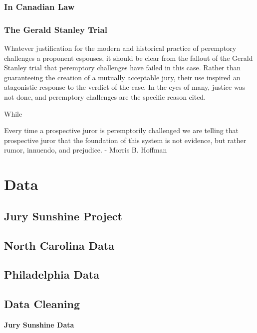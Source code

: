 \documentclass{article}
\begin{document}
\subsubsection{In Canadian Law}

\subsubsection{The Gerald Stanley Trial}

Whatever justification for the modern and historical practice of peremptory challenges a proponent espouses, it should be clear
from the fallout of the Gerald Stanley trial that peremptory challenges have failed in this case. Rather than guaranteeing the
creation of a mutually acceptable jury, their use inspired an atagonistic response to the verdict of the case. In the eyes of
many, justice was not done, and peremptory challenges are the specific reason cited.

While

Every time a prospective juror is peremptorily challenged we are telling that prospective juror that the foundation of this system
is not evidence, but rather rumor, innuendo, and prejudice. - Morris B. Hoffman \cite{hoffman1997}

\section{Data} \label{sec:data}

\subsection{Jury Sunshine Project} \label{subsec:jspdata}

\subsection{North Carolina Data} \label{subsec:norcardata}

\subsection{Philadelphia Data} \label{subsec:phillydata}

\subsection{Data Cleaning} \label{subsec:datacleaning}

\textbf{Jury Sunshine Data}
\end{document}
